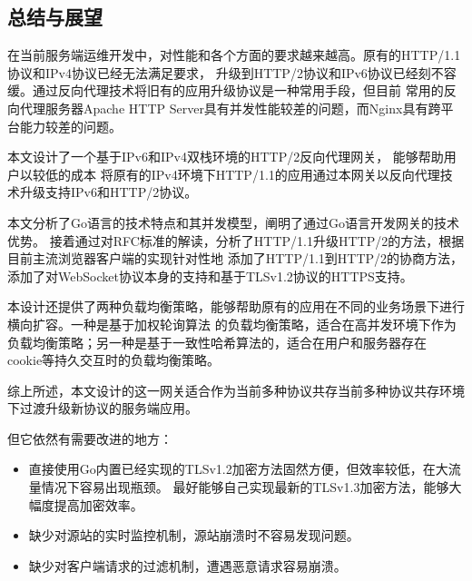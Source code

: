 \documentclass[twoside]{CUGThesis}
\begin{document}
	\begin{spacing}{2}
		\section{总结与展望}
	\end{spacing}
	在当前服务端运维开发中，对性能和各个方面的要求越来越高。原有的HTTP/1.1协议和IPv4协议已经无法满足要求，
	升级到HTTP/2协议和IPv6协议已经刻不容缓。通过反向代理技术将旧有的应用升级协议是一种常用手段，但目前
	常用的反向代理服务器Apache HTTP Server具有并发性能较差的问题，而Nginx具有跨平台能力较差的问题。\par
	 本文设计了一个基于IPv6和IPv4双栈环境的HTTP/2反向代理网关， 能够帮助用户以较低的成本
	 将原有的IPv4环境下HTTP/1.1的应用通过本网关以反向代理技术升级支持IPv6和HTTP/2协议。\par 
	 本文分析了Go语言的技术特点和其并发模型，阐明了通过Go语言开发网关的技术优势。
	 接着通过对RFC标准的解读，分析了HTTP/1.1升级HTTP/2的方法，根据目前主流浏览器客户端的实现针对性地
	 添加了HTTP/1.1到HTTP/2的协商方法，添加了对WebSocket协议本身的支持和基于TLSv1.2协议的HTTPS支持。\par
	 本设计还提供了两种负载均衡策略，能够帮助原有的应用在不同的业务场景下进行横向扩容。一种是基于加权轮询算法
	 的负载均衡策略，适合在高并发环境下作为负载均衡策略；另一种是基于一致性哈希算法的，适合在用户和服务器存在
	 cookie等持久交互时的负载均衡策略。\par 
	 综上所述，本文设计的这一网关适合作为当前多种协议共存当前多种协议共存环境下过渡升级新协议的服务端应用。\par 
	 但它依然有需要改进的地方：
	 \begin{itemize}
		\item 直接使用Go内置已经实现的TLSv1.2加密方法固然方便，但效率较低，在大流量情况下容易出现瓶颈。
		最好能够自己实现最新的TLSv1.3加密方法，能够大幅度提高加密效率。
		\item 缺少对源站的实时监控机制，源站崩溃时不容易发现问题。
		\item 缺少对客户端请求的过滤机制，遭遇恶意请求容易崩溃。
	 \end{itemize}
	
\end{document}

